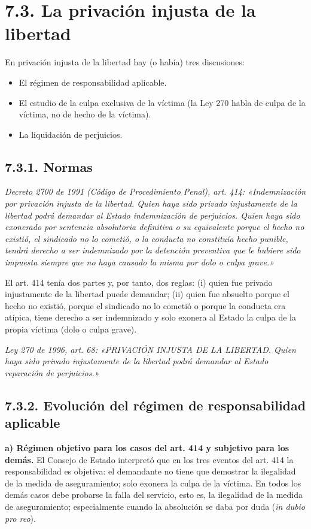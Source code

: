 \section{7.3. La privación injusta de la libertad}
En privación injusta de la libertad hay (o había) tres discusiones:

\begin{itemize}
\item El régimen de responsabilidad aplicable.
\item El estudio de la culpa exclusiva de la víctima (la Ley 270 habla de culpa de la víctima, no de hecho de la víctima).
\item La liquidación de perjuicios.
\end{itemize}
\subsection{7.3.1. Normas}
\begin{cita}
\textit{Decreto 2700 de 1991 (Código de Procedimiento Penal), art. 414: «Indemnización por privación injusta de la libertad. Quien haya sido privado injustamente de la libertad podrá demandar al Estado indemnización de perjuicios. Quien haya sido exonerado por sentencia absolutoria definitiva o su equivalente porque el hecho no existió, el sindicado no lo cometió, o la conducta no constituía hecho punible, tendrá derecho a ser indemnizado por la detención preventiva que le hubiere sido impuesta siempre que no haya causado la misma por dolo o culpa grave.»}
\end{cita}
El art. 414 tenía dos partes y, por tanto, dos reglas: (i) quien fue privado injustamente de la libertad puede demandar; (ii) quien fue absuelto porque el hecho no existió, porque el sindicado no lo cometió o porque la conducta era atípica, tiene derecho a ser indemnizado y solo exonera al Estado la culpa de la propia víctima (dolo o culpa grave).

\begin{cita}
\textit{Ley 270 de 1996, art. 68: «PRIVACIÓN INJUSTA DE LA LIBERTAD. Quien haya sido privado injustamente de la libertad podrá demandar al Estado reparación de perjuicios.»}
\end{cita}
\subsection{7.3.2. Evolución del régimen de responsabilidad aplicable}
\textbf{a) Régimen objetivo para los casos del art. 414 y subjetivo para los demás.} El Consejo de Estado interpretó que en los tres eventos del art. 414 la responsabilidad es objetiva: el demandante no tiene que demostrar la ilegalidad de la medida de aseguramiento; solo exonera la culpa de la víctima. En todos los demás casos debe probarse la falla del servicio, esto es, la ilegalidad de la medida de aseguramiento; especialmente cuando la absolución se daba por duda (\textit{in dubio pro reo}).

